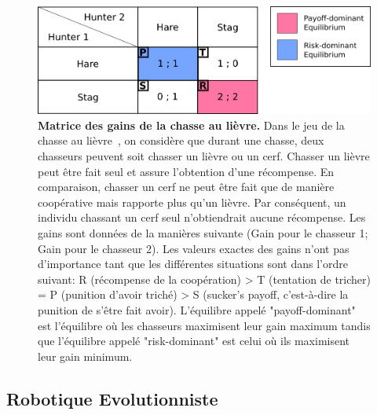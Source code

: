     \begin{figure}[hbt]
        \begin{center}
          \includegraphics[scale = 0.50]{fig/Intro/StagHunt.png}
          \caption{\textbf{Matrice des gains de la chasse au lièvre.}
          Dans le jeu de la chasse au lièvre~\parencite{Skyrms2004}, on considère que durant une chasse, deux chasseurs peuvent soit chasser un lièvre ou un cerf. Chasser un lièvre peut être fait seul et assure l'obtention d'une récompense. En comparaison, chasser un cerf ne peut être fait que de manière coopérative mais rapporte plus qu'un lièvre. Par conséquent, un individu chassant un cerf seul n'obtiendrait aucune récompense. Les gains sont données de la manières suivante (Gain pour le chasseur 1; Gain pour le chasseur 2). Les valeurs exactes des gains n'ont pas d'importance tant que les différentes situations sont dans l'ordre suivant: R (récompense de la coopération) > T (tentation de tricher) = P (punition d'avoir triché) > S (sucker's payoff, c'est-à-dire la punition de s'être fait avoir). L'équilibre appelé "payoff-dominant" est l'équilibre où les chasseurs maximisent leur gain maximum tandis que l'équilibre appelé "risk-dominant" est celui où ils maximisent leur gain minimum.} 
          \label{fig:MatrixStagHunt}
        \end{center}
    \end{figure}


  \subsection{Robotique Evolutionniste}

